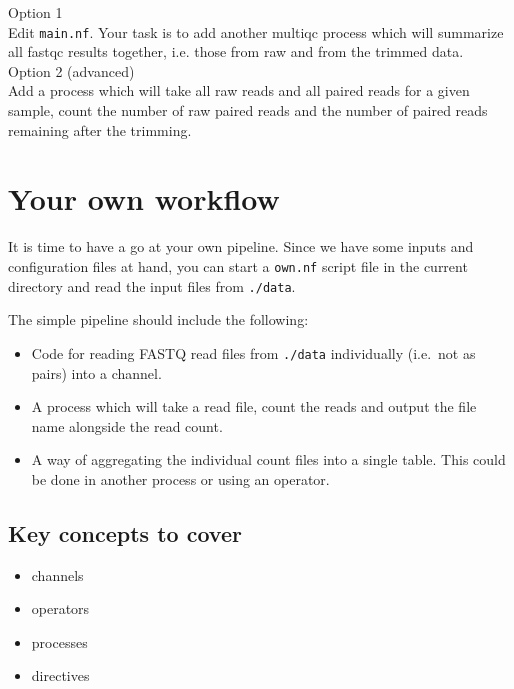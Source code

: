 \begin{steps}


Option 1\\
Edit \texttt{main.nf}. Your task is to add another multiqc process which will summarize all fastqc results together, i.e. those from raw and from the trimmed data. \\

Option 2 (advanced) \\
Add a process which will take all raw reads and all paired reads for a given sample, count the number of raw paired reads and the number of paired reads remaining after the trimming.


\end{steps}

\section{Your own workflow}

It is time to have a go at your own pipeline. 
Since we have some inputs and configuration files at hand, 
you can start a \texttt{own.nf} script file in the current 
directory and read the input files from \texttt{./data}. 

The simple pipeline should include the following:

\begin{itemize}
\item Code for reading FASTQ read files from \texttt{./data} individually (i.e.\ not as pairs) into a channel.
\item A process which will take a read file, count the reads and output the file name alongside the read count.
\item A way of aggregating the individual count files into a single table. This could be done in another process or using an operator. 
\end{itemize}

\subsection{Key concepts to cover}



\begin{itemize}
 \item channels
 \item operators
 \item processes
 \item directives
\end{itemize}

